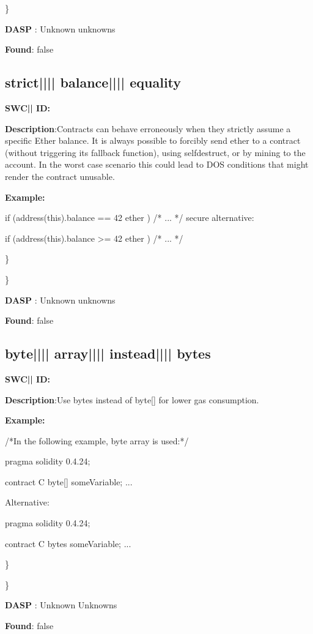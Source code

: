 \documentclass{article}
\begin{document}
\} 

\textbf{DASP} : Unknown unknowns

\textbf{Found}: false

\subsection{strict{||\textunderscore|| }balance{||\textunderscore|| }equality} 
\textbf{SWC{|\textunderscore| }ID:} 

\textbf{Description}:Contracts can behave erroneously when they strictly assume a specific Ether balance. It is always possible to forcibly send ether to a contract (without triggering its fallback function), using selfdestruct, or by mining to the account. In the worst case scenario this could lead to DOS conditions that might render the contract unusable.


\textbf{Example:} 
\begin{ffcode} 

if (address(this).balance == 42 ether ) {
    /* ... */
}
 secure alternative:

if (address(this).balance >= 42 ether ) {
  /* ... */
}

\end{ffcode} 
\} 

\} 

\textbf{DASP} : Unknown unknowns

\textbf{Found}: false

\subsection{byte{||\textunderscore|| }array{||\textunderscore|| }instead{||\textunderscore|| }bytes} 
\textbf{SWC{|\textunderscore| }ID:} 

\textbf{Description}:Use bytes instead of byte[] for lower gas consumption.


\textbf{Example:} 
\begin{ffcode} 

/*In the following example, byte array is used:*/ 

pragma solidity 0.4.24;

contract C {
    byte[] someVariable;
    ...
}

Alternative:

pragma solidity 0.4.24;

contract C {
    bytes someVariable;
    ...
}

\end{ffcode} 
\} 

\} 

\textbf{DASP} : Unknown Unknowns

\textbf{Found}: false
\end{document}
